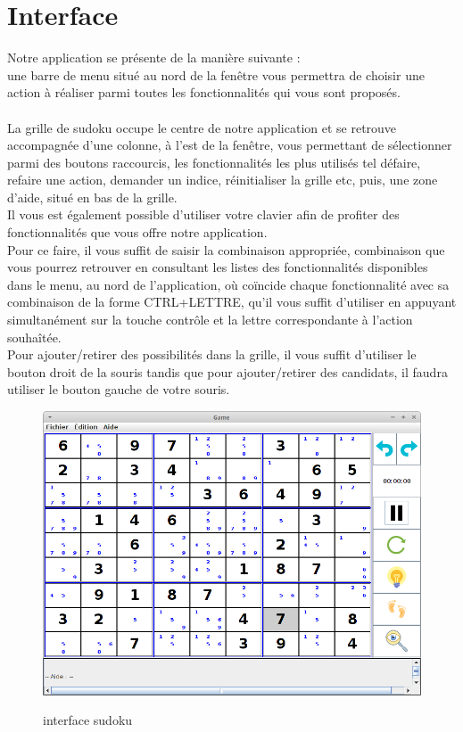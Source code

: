 \section{Interface}

Notre application se présente de la manière suivante :\\
une barre de menu situé au nord de la fenêtre vous permettra de choisir 
une action à réaliser parmi toutes les fonctionnalités qui vous sont proposés.\\
\\
La grille de sudoku occupe le centre de notre application et se retrouve accompagnée 
d'une colonne, à l'est de la fenêtre, vous permettant de sélectionner 
parmi des boutons raccourcis, les fonctionnalités les plus utilisés tel défaire, 
refaire une action, demander un indice, réinitialiser la grille etc, puis, 
une zone d'aide, situé en bas de la grille.\\

Il vous est également possible d'utiliser votre clavier afin de profiter 
des fonctionnalités que vous offre notre application.\\
Pour ce faire, il vous suffit de saisir la combinaison appropriée, combinaison 
que vous pourrez retrouver en consultant les listes des fonctionnalités disponibles dans le menu, 
au nord de l'application, où coïncide chaque fonctionnalité avec sa combinaison 
de la forme CTRL+LETTRE, qu'il vous suffit d'utiliser en appuyant simultanément 
sur la touche contrôle et la lettre correspondante à l'action souhaîtée. \\

Pour ajouter/retirer des possibilités dans la grille, il vous suffit d'utiliser 
le bouton droit de la souris tandis que pour ajouter/retirer des candidats, il 
faudra utiliser le bouton gauche de votre souris.

\begin{figure}[ht]
  \caption{\label{annexe6} interface sudoku}
  \includegraphics [width=130mm]{images/interface.png} \\[0.5cm]
\end{figure}

